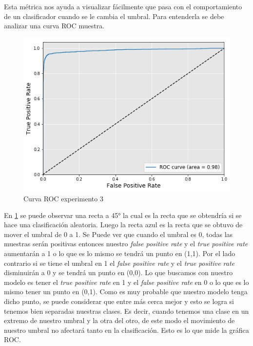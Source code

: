 \par Esta métrica nos ayuda a visualizar fácilmente que pasa con el comportamiento de un clasificador cuando se le cambia el umbral. Para entenderla se debe analizar una curva ROC muestra.

\begin{figure}[H]
	\centering
	\includegraphics[width=\linewidth]{imagenes/ROC_Exp3_1.png}
	\caption{Curva ROC experimento 3}
	\label{fig:ROCMuestra}
\end{figure}

\par En \ref{fig:ROCMuestra} se puede observar una recta a \ang{45} la cual es la recta que se obtendría si se hace una clasificación aleatoria. Luego la recta azul es la recta que se obtuvo de mover el umbral de 0 a 1. Se Puede ver que cuando el umbral es 0, todas las muestras serán positivas entonces nuestro \textit{false positive rate} y el  \textit{true positive rate} aumentarán a 1 o lo que es lo mismo se tendrá un punto en (1,1). Por el lado contrario si se tiene el umbral en 1 el \textit{false positive rate} y el  \textit{true positive rate} disminuirán a 0 y se tendrá un punto en (0,0). Lo que buscamos con nuestro modelo es tener el \textit{true positive rate} en 1 y el \textit{false positive rate} en 0 o lo que es lo mismo tener un punto en (0,1). Como es muy probable que nuestro modelo tenga dicho punto, se puede considerar que entre más cerca mejor y esto se logra si tenemos bien separadas nuestras clases. Es decir, cuando tenemos una clase en un extremo de nuestro umbral y la otra del otro, de este modo el movimiento de nuestro umbral no afectará tanto en la clasificación. Esto es lo que mide la gráfica ROC.

